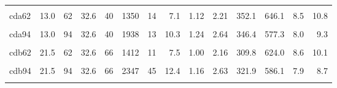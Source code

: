 \begin{landscape}
\begin{longtable}[t]{lrrrrrrrrrrrrr}
\endfoot
\bottomrule
\endlastfoot
\cellcolor{gray!6}{cda46} & \cellcolor{gray!6}{13.0} & \cellcolor{gray!6}{46} & \cellcolor{gray!6}{32.6} & \cellcolor{gray!6}{40} & \cellcolor{gray!6}{1489} & \cellcolor{gray!6}{15} & \cellcolor{gray!6}{7.9} & \cellcolor{gray!6}{1.12} & \cellcolor{gray!6}{2.46} & \cellcolor{gray!6}{382.5} & \cellcolor{gray!6}{633.0} & \cellcolor{gray!6}{8.4} & \cellcolor{gray!6}{11.3}\\
cda62 & 13.0 & 62 & 32.6 & 40 & 1350 & 14 & 7.1 & 1.12 & 2.21 & 352.1 & 646.1 & 8.5 & 10.8\\
\cellcolor{gray!6}{cda78} & \cellcolor{gray!6}{13.0} & \cellcolor{gray!6}{78} & \cellcolor{gray!6}{32.6} & \cellcolor{gray!6}{40} & \cellcolor{gray!6}{1864} & \cellcolor{gray!6}{16} & \cellcolor{gray!6}{9.9} & \cellcolor{gray!6}{1.39} & \cellcolor{gray!6}{2.38} & \cellcolor{gray!6}{626.5} & \cellcolor{gray!6}{626.5} & \cellcolor{gray!6}{7.8} & \cellcolor{gray!6}{12.1}\\
cda94 & 13.0 & 94 & 32.6 & 40 & 1938 & 13 & 10.3 & 1.24 & 2.64 & 346.4 & 577.3 & 8.0 & 9.3\\
\cellcolor{gray!6}{cdb46} & \cellcolor{gray!6}{21.5} & \cellcolor{gray!6}{46} & \cellcolor{gray!6}{32.6} & \cellcolor{gray!6}{66} & \cellcolor{gray!6}{1813} & \cellcolor{gray!6}{18} & \cellcolor{gray!6}{9.6} & \cellcolor{gray!6}{1.04} & \cellcolor{gray!6}{2.32} & \cellcolor{gray!6}{377.3} & \cellcolor{gray!6}{669.6} & \cellcolor{gray!6}{8.6} & \cellcolor{gray!6}{12.0}\\
cdb62 & 21.5 & 62 & 32.6 & 66 & 1412 & 11 & 7.5 & 1.00 & 2.16 & 309.8 & 624.0 & 8.6 & 10.1\\
\cellcolor{gray!6}{cdb78} & \cellcolor{gray!6}{21.5} & \cellcolor{gray!6}{78} & \cellcolor{gray!6}{32.6} & \cellcolor{gray!6}{66} & \cellcolor{gray!6}{1889} & \cellcolor{gray!6}{14} & \cellcolor{gray!6}{10.0} & \cellcolor{gray!6}{0.92} & \cellcolor{gray!6}{2.50} & \cellcolor{gray!6}{288.7} & \cellcolor{gray!6}{595.7} & \cellcolor{gray!6}{8.4} & \cellcolor{gray!6}{8.4}\\
cdb94 & 21.5 & 94 & 32.6 & 66 & 2347 & 45 & 12.4 & 1.16 & 2.63 & 321.9 & 586.1 & 7.9 & 8.7\\
\cellcolor{gray!6}{cdc46} & \cellcolor{gray!6}{26.1} & \cellcolor{gray!6}{46} & \cellcolor{gray!6}{32.6} & \cellcolor{gray!6}{80} & \cellcolor{gray!6}{1748} & \cellcolor{gray!6}{19} & \cellcolor{gray!6}{9.3} & \cellcolor{gray!6}{1.02} & \cellcolor{gray!6}{1.56} & \cellcolor{gray!6}{358.9} & \cellcolor{gray!6}{663.2} & \cellcolor{gray!6}{9.5} & \cellcolor{gray!6}{11.4}\\

\end{longtable}
\end{landscape}
